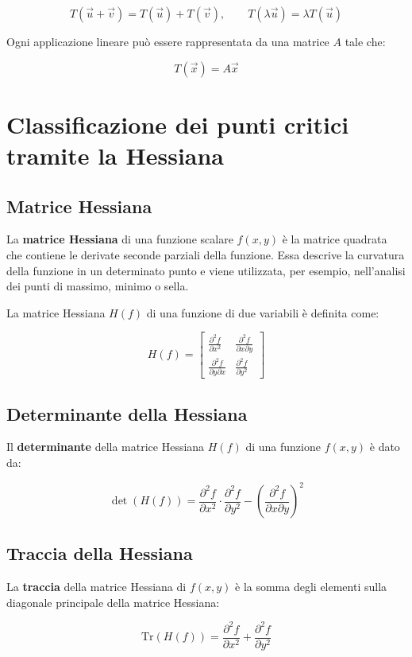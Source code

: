 \documentclass{article}
\begin{document}
\[
T(\vec{u} + \vec{v}) = T(\vec{u}) + T(\vec{v}), \qquad
T(\lambda \vec{u}) = \lambda T(\vec{u})
\]

Ogni applicazione lineare può essere rappresentata da una matrice \( A \) tale che:

\[
T(\vec{x}) = A\vec{x}
\]

\section{Classificazione dei punti critici tramite la Hessiana}
\subsection*{Matrice Hessiana}
La \textbf{matrice Hessiana} di una funzione scalare \( f(x, y) \) è la matrice quadrata che contiene le derivate seconde parziali della funzione. Essa descrive la curvatura della funzione in un determinato punto e viene utilizzata, per esempio, nell'analisi dei punti di massimo, minimo o sella.

La matrice Hessiana \( H(f) \) di una funzione di due variabili è definita come:

\[
H(f) = 
\begin{bmatrix}
\frac{\partial^2 f}{\partial x^2} & \frac{\partial^2 f}{\partial x \partial y} \\
\frac{\partial^2 f}{\partial y \partial x} & \frac{\partial^2 f}{\partial y^2}
\end{bmatrix}
\]

\subsection*{Determinante della Hessiana}
Il \textbf{determinante} della matrice Hessiana \( H(f) \) di una funzione \( f(x, y) \) è dato da:

\[
\det(H(f)) = \frac{\partial^2 f}{\partial x^2} \cdot \frac{\partial^2 f}{\partial y^2} - \left( \frac{\partial^2 f}{\partial x \partial y} \right)^2
\]

\subsection*{Traccia della Hessiana}
La \textbf{traccia} della matrice Hessiana di \( f(x, y) \) è la somma degli elementi sulla diagonale principale della matrice Hessiana:

\[
\text{Tr}(H(f)) = \frac{\partial^2 f}{\partial x^2} + \frac{\partial^2 f}{\partial y^2}
\]
\end{document}
